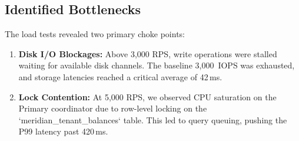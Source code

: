 \subsection{Identified Bottlenecks}
The load tests revealed two primary choke points:
\begin{enumerate}
  \item \textbf{Disk I/O Blockages:} Above 3,000 RPS, write operations were stalled waiting for available disk channels. The baseline 3,000~IOPS was exhausted, and storage latencies reached a critical average of 42\,ms.
  \item \textbf{Lock Contention:} At 5,000 RPS, we observed CPU saturation on the Primary coordinator due to row-level locking on the `meridian\_tenant\_balances` table. This led to query queuing, pushing the P99 latency past 420\,ms.
\end{enumerate}
